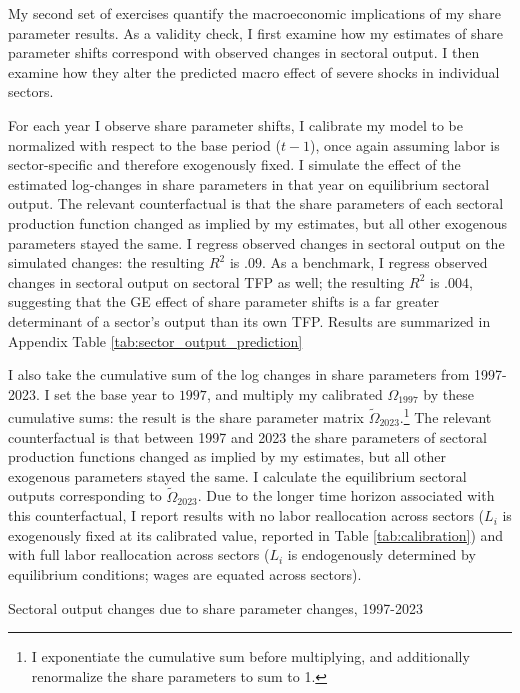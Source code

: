 \documentclass[11pt]{article}
\begin{document}
My second set of exercises quantify the macroeconomic implications of my share parameter results. As a validity check, I first examine how my estimates of share parameter shifts correspond with observed changes in sectoral output. I then examine how they alter the predicted macro effect of severe shocks in individual sectors.

For each year I observe share parameter shifts, I calibrate my model to be normalized with respect to the base period ($t-1$), once again assuming labor is sector-specific and therefore exogenously fixed. I simulate the effect of the estimated log-changes in share parameters in that year on equilibrium sectoral output. The relevant counterfactual is that the share parameters of each sectoral production function changed as implied by my estimates, but all other exogenous parameters stayed the same. I regress observed changes in sectoral output on the simulated changes: the resulting $R^2$ is $.09$. As a benchmark, I regress observed changes in sectoral output on sectoral TFP as well; the resulting $R^2$ is $.004$, suggesting that the GE effect of share parameter shifts is a far greater determinant of a sector's output than its own TFP. Results are summarized in Appendix Table \ref{tab:sector_output_prediction}

I also take the cumulative sum of the log changes in share parameters from 1997-2023. I set the base year to $1997$, and multiply my calibrated $\Omega_{1997}$ by these cumulative sums: the result is the share parameter matrix $\tilde{\Omega}_{2023}$.\footnote{I exponentiate the cumulative sum before multiplying, and additionally renormalize the share parameters to sum to 1.} The relevant counterfactual is that between 1997 and 2023 the share parameters of sectoral production functions changed as implied by my estimates, but all other exogenous parameters stayed the same. I calculate the equilibrium sectoral outputs corresponding to $\tilde{\Omega}_{2023}$. Due to the longer time horizon associated with this counterfactual, I report results with no labor reallocation across sectors ($L_i$ is exogenously fixed at its calibrated value, reported in Table \ref{tab:calibration}) and with full labor reallocation across sectors ($L_i$ is endogenously determined by equilibrium conditions; wages are equated across sectors). 

\begin{table}[!h]
    \centering 
    \caption{Sectoral output changes due to share parameter changes, 1997-2023}
    \label{tab:share_parameter_results}
    
\end{table}
\end{document}
